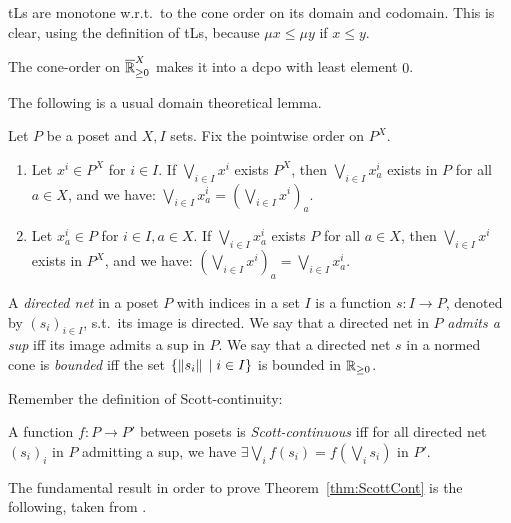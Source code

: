 \begin{remark}\label{rmk:tropMonot}
 tLs are monotone w.r.t.\ to the cone order on its domain and codomain.
 This is clear, using the definition of tLs, because $\mu x\leq \mu y$ if $x\leq y$.
\end{remark}

\begin{remark}
 The cone-order on $\overline{\mathbb{R}}_{\geq 0}^X$ makes it into a dcpo with least element $0$.
\end{remark}

The following is a usual domain theoretical lemma.

\begin{lemma}\label{lm:sup=sup}
 Let $P$ be a poset and $X, I$ sets. Fix the pointwise order on $P^X$.
 \begin{enumerate}
  \item Let $x^i\in P^X$ for $i\in I$.
  If $\bigvee\limits_{i\in I} x^i$ exists $P^X$, then $\bigvee\limits_{i\in I} x^i_a$ exists in $P$ for all $a\in X$, and we have: $\bigvee\limits_{i\in I} x^i_a=\left(\bigvee\limits_{i\in I} x^i\right)_a$.
 \item Let $x^i_a\in P$ for $i\in I,a\in X$.
  If $\bigvee\limits_{i\in I} x^i_a$ exists $P$ for all $a\in X$, then $\bigvee\limits_{i\in I} x^i$ exists in $P^X$, and we have: $\left(\bigvee\limits_{i\in I} x^i\right)_a=\bigvee\limits_{i\in I} x^i_a$.
 \end{enumerate}
\end{lemma}

A \emph{directed net} in a poset $P$ with indices in a set $I$ is a function $s:I\to P$, denoted by $(s_i)_{i\in I}$, s.t.\ its image is directed.
We say that a directed net in $P$ \emph{admits a sup} iff its image admits a sup in $P$.
We say that a directed net $s$ in a normed cone is \emph{bounded} iff the set $\{\lVert s_i\rVert\,\mid i\in I\}$ is bounded in $\mathbb{R}_{\geq 0}$.

Remember the definition of Scott-continuity:

\begin{definition}
 A function $f:P\to P'$ between posets is \emph{Scott-continuous} iff for all directed net $(s_i)_i$ in $P$ admitting a sup, we have $\exists \bigvee\limits_i f(s_i) = f(\bigvee\limits_i s_i)$ in $P'$. 
\end{definition}

The fundamental result in order to prove Theorem~\ref{thm:ScottCont} is the following, taken from \cite{Selinger2004}.

